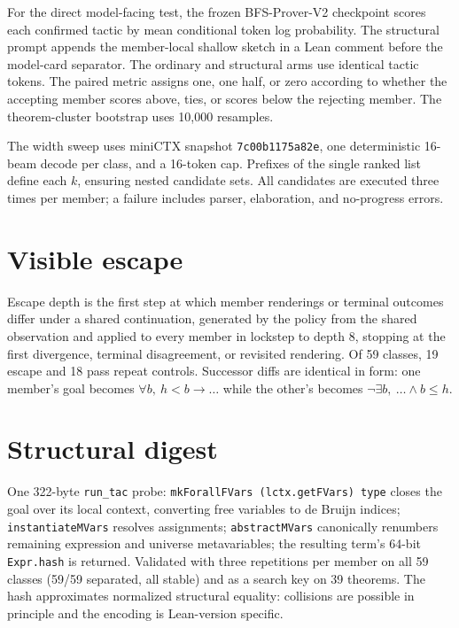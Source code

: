 \documentclass[11pt]{article}
\begin{document}
For the direct model-facing test, the frozen BFS-Prover-V2 checkpoint scores
each confirmed tactic by mean conditional token log probability. The structural
prompt appends the member-local shallow sketch in a Lean comment before the
model-card separator. The ordinary and structural arms use identical tactic
tokens. The paired metric assigns one, one half, or zero according to whether
the accepting member scores above, ties, or scores below the rejecting member.
The theorem-cluster bootstrap uses 10{,}000 resamples.

The width sweep uses miniCTX snapshot \texttt{7c00b1175a82e}, one
deterministic 16-beam decode per class, and a 16-token cap. Prefixes of the
single ranked list define each $k$, ensuring nested candidate sets. All
candidates are executed three times per member; a failure includes parser,
elaboration, and no-progress errors.

\section{Visible escape}
\label{app:escape}
Escape depth is the first step at which member renderings or terminal outcomes
differ under a shared continuation, generated by the policy from the shared
observation and applied to every member in lockstep to depth 8, stopping at the
first divergence, terminal disagreement, or revisited rendering. Of 59 classes,
19 escape and 18 pass repeat controls. Successor diffs are identical in
form: one member's goal becomes $\forall b,\ h<b \rightarrow \dots$ while the
other's becomes $\neg\exists b,\ \dots \wedge b \leq h$.

\section{Structural digest}
\label{app:digest}
One 322-byte \texttt{run\_tac} probe: \texttt{mkForallFVars (lctx.getFVars)
type} closes the goal over its local context, converting free variables to de
Bruijn indices; \texttt{instantiateMVars} resolves assignments;
\texttt{abstractMVars} canonically renumbers remaining expression and universe
metavariables; the resulting term's 64-bit \texttt{Expr.hash} is returned.
Validated with three repetitions per member on all 59 classes (59/59 separated,
all stable) and as a search key on 39 theorems. The hash approximates
normalized structural equality: collisions are possible in principle and the
encoding is Lean-version specific.
\end{document}
